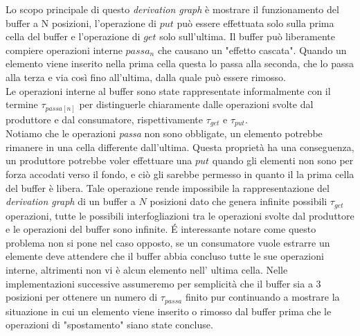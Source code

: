 \documentclass[a4paper]{article}
\begin{document}
Lo scopo principale di questo \textit{derivation graph} è mostrare il funzionamento del buffer a N posizioni, l'operazione di $put$ può essere effettuata solo sulla prima cella del buffer e l'operazione di $get$ solo sull'ultima.
Il buffer può liberamente compiere operazioni interne $passa_n$ che causano un "effetto cascata".
Quando un elemento viene inserito nella prima cella questa lo passa alla seconda, che lo passa alla terza e via così fino all'ultima, dalla quale può essere rimosso.\\
Le operazioni interne al buffer sono state rappresentate informalmente con il termine $\tau_{passa[n]}$ per distinguerle chiaramente dalle operazioni svolte dal produttore e dal consumatore, rispettivamente $\tau_{get}$ e $\tau_{put}$.\\
Notiamo che le operazioni \textit{passa} non sono obbligate, un elemento potrebbe rimanere in una cella differente dall'ultima.
Questa proprietà ha una conseguenza, un produttore potrebbe voler effettuare una $put$ quando gli elementi non sono per forza accodati verso il fondo, e ciò gli sarebbe permesso in quanto il la prima cella del buffer è libera.
Tale operazione rende impossibile la rappresentazione del \textit{derivation graph} di un buffer a $N$ posizioni dato che genera infinite possibili $\tau_{get}$ operazioni, tutte le possibili interfogliazioni tra le operazioni svolte dal produttore e le operazioni del buffer sono infinite.
É interessante notare come questo problema non si pone nel caso opposto, se un consumatore vuole estrarre un elemente deve attendere che il buffer abbia concluso tutte le sue operazioni interne, altrimenti non vi è alcun elemento nell' ultima cella.
Nelle implementazioni successive assumeremo per semplicità che il buffer sia a 3 posizioni per ottenere un numero di $\tau_{passa}$ finito pur continuando a mostrare la situazione in cui un elemento viene inserito o rimosso dal buffer prima che le operazioni di "spostamento" siano state concluse.
\end{document}
